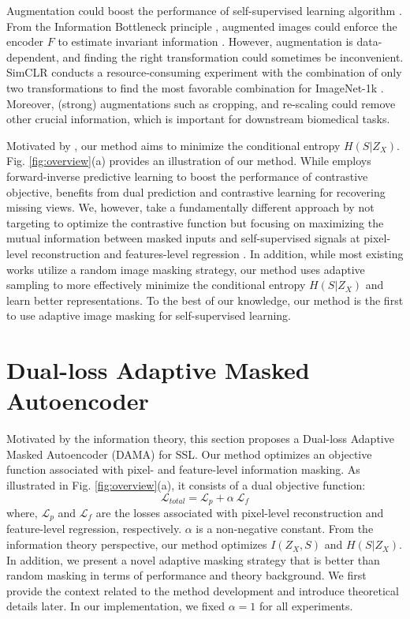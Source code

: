 \documentclass[10pt,twocolumn,letterpaper]{article}
\begin{document}
Augmentation could boost the performance of self-supervised learning algorithm \cite{simclr,byol,moco}. From the Information Bottleneck principle \cite{ib1}, augmented images could enforce the encoder $F$ to estimate invariant information \cite{mutual}. However, augmentation is data-dependent, and finding the right transformation could sometimes be inconvenient. SimCLR \cite{simclr} conducts a resource-consuming experiment with the combination of only two transformations to find the most favorable combination for ImageNet-1k \cite{imagenet}. Moreover, (strong) augmentations such as cropping, and re-scaling could remove other crucial information, which is important for downstream biomedical tasks. 

Motivated by \cite{morency,completer}, our method aims to minimize the conditional entropy $H(S|Z_X)$.  Fig. \ref{fig:overview}(a) provides an illustration of our method. While \cite{morency} employs forward-inverse predictive learning to boost the performance of contrastive objective, \cite{completer} benefits from dual prediction and contrastive learning for recovering missing views. We, however, take a fundamentally different approach by not targeting to optimize the contrastive function \cite{morency,completer} but focusing on maximizing the mutual information between masked inputs and self-supervised signals at pixel-level reconstruction \cite{mae,beit,simmim} and features-level regression \cite{data2vec}. In addition, while most existing works \cite{mae,beit,simmim,data2vec} utilize a random image masking strategy, our method uses adaptive sampling to more effectively minimize the conditional entropy $H(S|Z_X)$ and learn better representations. To the best of our knowledge, our method is the first to use adaptive image masking for self-supervised learning.
\section{Dual-loss Adaptive Masked Autoencoder}
\label{sec:method}
Motivated by the information theory, this section proposes a Dual-loss Adaptive Masked Autoencoder (DAMA) for SSL. Our method optimizes an objective function associated with pixel- and feature-level information masking. As illustrated in Fig. \ref{fig:overview}(a), it consists of a dual objective function:
\begin{equation}\label{eq:eq6}
\mathcal L_{total} = \mathcal L_{p} + \alpha\:\mathcal L_{f}
\end{equation}
where, $\mathcal L_{p}$ and $\mathcal L_{f}$ are the losses associated with pixel-level reconstruction and feature-level regression, respectively. $\alpha$ is a non-negative constant. From the information theory perspective, our method optimizes $I(Z_X,S)$ and $H(S|Z_X)$. In addition, we present a novel adaptive masking strategy that is better than random masking in terms of performance and theory background. We first provide the context related to the method development and introduce theoretical details later. In our implementation, we fixed $\alpha=1$ for all experiments.
\end{document}
